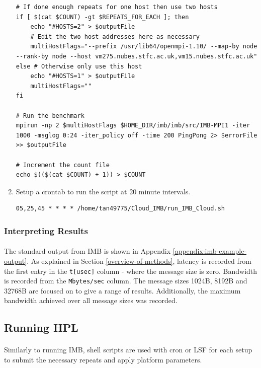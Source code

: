 \documentclass{article}
\newenvironment{code}{\captionsetup{type=listing}}{}
\begin{document}
\begin{enumerate}
\begin{code}
\begin{verbatim}
# If done enough repeats for one host then use two hosts
if [ $(cat $COUNT) -gt $REPEATS_FOR_EACH ]; then
    echo "#HOSTS=2" > $outputFile
    # Edit the two host addresses here as necessary
    multiHostFlags="--prefix /usr/lib64/openmpi-1.10/ --map-by node  --rank-by node --host vm275.nubes.stfc.ac.uk,vm15.nubes.stfc.ac.uk"
else # Otherwise only use this host
    echo "#HOSTS=1" > $outputFile
    multiHostFlags=""
fi

# Run the benchmark
mpirun -np 2 $multiHostFlags $HOME_DIR/imb/imb/src/IMB-MPI1 -iter 1000 -msglog 0:24 -iter_policy off -time 200 PingPong 2> $errorFile >> $outputFile

# Increment the count file
echo $(($(cat $COUNT) + 1)) > $COUNT
                    \end{verbatim}
                    \end{code}
                \item Setup a crontab to run the script at 20 minute intervals.

                    \begin{verbatim}
05,25,45 * * * * /home/tan49775/Cloud_IMB/run_IMB_Cloud.sh
                    \end{verbatim}
            \end{enumerate}

        \subsubsection{Interpreting Results}
            \paragraph{}
            The standard output from IMB is shown in Appendix \ref{appendix:imb-example-output}. As explained in Section \ref{overview-of-methods}, latency is recorded from the first entry in the \verb|t[usec]| column - where the message size is zero. Bandwidth is recorded from the \verb|Mbytes/sec| column. The message sizes 1024B, 8192B and 32768B are focused on to give a range of results. Additionally, the maximum bandwidth achieved over all message sizes was recorded.


    \subsection{Running HPL}
        \paragraph{}
        Similarly to running IMB, shell scripts are used with cron or LSF for each setup to submit the necessary repeats and apply platform parameters.
\end{document}
